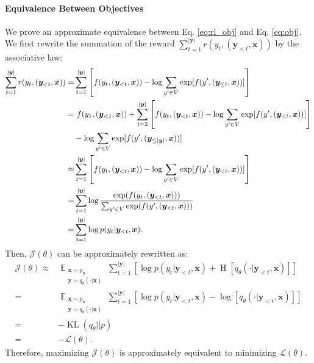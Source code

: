 \documentclass{article}
\def\expct{\mathop{\mathbb{E}}}
\def\ptt{p(y_t | \by_{<t}, \bx)}
\def\ps{q_\theta}
\def\pt{p}
\def\bx{\bm{x}}
\def\by{\bm{y}}
\begin{document}
\paragraph{Equivalence Between Objectives} We prove an approximate equivalence between Eq. \ref{eq:rl_obj} and Eq. \ref{eq:obj}. We first rewrite the summation of the reward $\sum_{t=1}^{|\by|} r(y_t, (\by_{<t},\bx))$ by the associative law:
{\small
\begin{align}
    \sum_{t=1}^{|\by|} r(y_t, (\by_{<t},\bx)) =& \sum_{t=1}^{|\by|} \left[f(y_t, (\by_{<t},\bx)) - \log \sum_{y'\in V} \operatorname{exp}[f(y', (\by_{\le t}, \bx))]\right] \\
    =& \ f(y_1, (\by_{<1},\bx)) + \sum_{t=2}^{|\by|} \left[f(y_t, (\by_{<t},\bx)) - \log \sum_{y'\in V} \operatorname{exp}[f(y', (\by_{\color{red}{<t}}, \bx))]\right] \\
    & - \log \sum_{y'\in V} \operatorname{exp}[f(y', (\by_{\le |\by|}, \bx))] \\
    \approx & \sum_{t=1}^{|\by|} \left[f(y_t, (\by_{<t},\bx)) - \log \sum_{y'\in V} \operatorname{exp}[f(y', (\by_{\color{red}{<t}}, \bx))]\right] \\
    =& \sum_{t=1}^{|\by|} \log \frac{\operatorname{exp}(f(y_t, (\by_{<t},\bx)))}{\sum_{y'\in V}\operatorname{exp}(f(y', (\by_{<t},\bx)))} \\
    =& \sum_{t=1}^{|\by|} \log \ptt.
\end{align}
}
Then, $\mathcal{J}(\theta)$ can be approximately rewritten as:
{\small
\begin{align}
    \mathcal{J}(\theta) \approx &\expct_{\substack{\bx \sim p_{\bx} \\ \by \sim \ps (\cdot | \bx)}} \sum_{t=1}^{|\by|} \left[\log \ptt + \operatorname{H}\left[q_{\theta}(\cdot | \by_{<t}, \bx)\right]\right] \\
    = & \expct_{\substack{\bx \sim p_{\bx} \\ \by \sim \ps (\cdot | \bx)}}  \sum_{t=1}^{|\by|} \left[\log \ptt -\log \left[q_{\theta}(\cdot | \by_{<t}, \bx)\right]\right] \\
    = & -\operatorname{KL}(\ps || \pt) \\
    = & -\mathcal{L}(\theta).
\end{align}
}
Therefore, maximizing $\mathcal{J}(\theta)$ is approximately equivalent to minimizing $\mathcal{L}(\theta)$.
\end{document}
